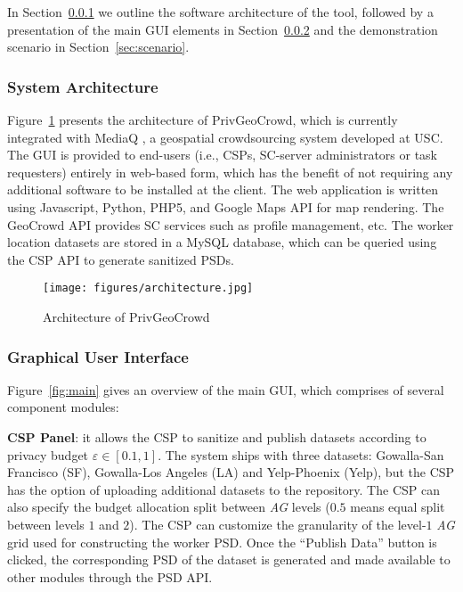 \documentclass{USC-Thesis}
\newcommand{\PGC}{{PrivGeoCrowd}}
\numberwithin{equation}{chapter}
\begin{document}
In Section~\ref{sec:architecture} we outline the software architecture of the tool, followed by a presentation of the main GUI elements in Section~\ref{sec:gui} and the demonstration scenario in Section~\ref{sec:scenario}.

\subsubsection{System Architecture}
\label{sec:architecture}

Figure~\ref{fig:architecture} presents the architecture of \PGC, which is currently integrated with MediaQ \cite{kim2014mediaq}, a geospatial crowdsourcing system developed at USC. The GUI is provided to end-users (i.e., CSPs, SC-server administrators or task requesters) entirely in web-based form, which has the benefit of not requiring any additional software to be installed at the client. The web application is written using Javascript, Python, PHP5, and Google Maps API for map rendering. The GeoCrowd API provides SC services \cite{kim2014mediaq} such as profile management, etc. The worker location datasets are stored in a MySQL database, which can be queried using the CSP API to generate sanitized PSDs.

\begin{figure}[!htb]\centering
  \texttt{[image: figures/architecture.jpg]}
  \caption{Architecture of \PGC}
  \label{fig:architecture}
\end{figure}

\subsubsection{Graphical User Interface}
\label{sec:gui}

Figure~\ref{fig:main} gives an overview of the main GUI, which comprises of several component modules:

\textbf{CSP Panel}: it allows the CSP to sanitize and publish datasets according to privacy budget $\varepsilon \in [0.1,1]$. The system ships with three datasets: Gowalla-San Francisco (SF), Gowalla-Los Angeles (LA) and Yelp-Phoenix (Yelp), but the CSP has the option of uploading additional datasets to the repository. The CSP can also specify the budget allocation split between {\em AG} levels ($0.5$ means equal split between levels $1$ and $2$). The CSP can customize the granularity of the level-$1$ {\em AG} grid used for constructing the worker PSD. Once the ``Publish Data'' button is clicked, the corresponding PSD of the dataset is generated and made available to other modules through the PSD API.
\end{document}
